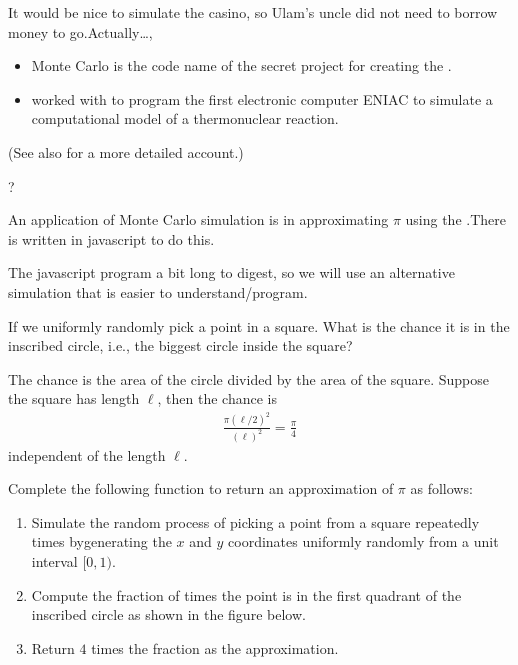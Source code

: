 \documentclass[letterpaper,10pt,english]{sphinxmanual}
\begin{document}
It would be nice to simulate the casino, so Ulam’s uncle did not need to borrow money to go.Actually…,
\begin{itemize}
\item {} 
Monte Carlo is the code name of the secret project for creating the .

\item {} 
 worked with  to program the first electronic computer ENIAC to simulate a computational model of a thermonuclear reaction.

\end{itemize}

(See also  for a more detailed account.)

?

An application of Monte Carlo simulation is in approximating \(\pi\) using
the .There is  written in javascript to do this.

The javascript program a bit long to digest, so we will use an alternative simulation that is easier to understand/program.

If we uniformly randomly pick a point in a square. What is the chance it is in the inscribed circle, i.e., the biggest circle inside the square?

The chance is the area of the circle divided by the area of the square. Suppose the square has length \(\ell\), then the chance is
\begin{equation*}
\begin{split} \frac{\pi (\ell /2)^2}{ (\ell)^2 } = \frac{\pi}4 \end{split}
\end{equation*}
independent of the length \(\ell\).

 Complete the following function to return an approximation of \(\pi\) as follows:
\begin{enumerate}
%
\item {} 
Simulate the random process of picking a point from a square repeatedly  times bygenerating the \(x\) and \(y\) coordinates uniformly randomly from a unit interval \([0,1)\).

\item {} 
Compute the fraction of times the point is in the first quadrant of the inscribed circle as shown in the figure below.

\item {} 
Return \(4\) times the fraction as the approximation.

\end{enumerate}
\end{document}
